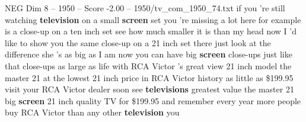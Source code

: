 \begin{textsample}{NEG Dim 8 – 1950 – Score -2.00 – 1950/tv\_com\_1950\_74.txt}  \label{ex:f8_neg_085}
if you 're still watching \textbf{television} on a small \textbf{screen} set you 're missing a lot here for example is a close-up on a ten inch set see how much smaller it is than my head now I 'd like to show you the same close-up on a 21 inch set there just look at the difference she 's as big as I am now you can have big \textbf{screen} close-ups just like that close-ups as large as life with RCA Victor 's great view 21 inch model the master 21 at the lowest 21 inch price in RCA Victor history as little as \$199.95 visit your RCA Victor dealer soon see \textbf{televisions} greatest value the master 21 big \textbf{screen} 21 inch quality TV for \$199.95 and remember every year more people buy RCA Victor than any other \textbf{television} you

\end{textsample}
